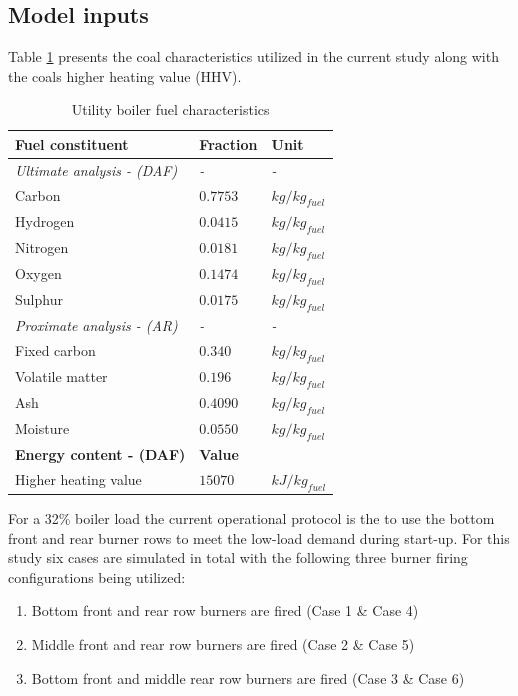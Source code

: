 \documentclass[review]{elsarticle}
\begin{document}
\subsection{Model inputs}
Table \ref{tbl_fuel} presents the coal characteristics utilized in the current study along with the coals higher heating value (HHV).\\
\begin{table}[h!]
\centering
\caption{Utility boiler fuel characteristics}
\vspace{5mm}
\label{tbl_fuel}
{\tabulinesep=1.2mm
\begin{tabularx}{\textwidth}{p{} p{} l}
\hline
\textbf{Fuel constituent} & \textbf{Fraction} & \textbf{Unit}\\
\hline
\textit{Ultimate analysis - (DAF)} & \textit{-} & \textit{-}\\
Carbon & $0.7753$ & $kg/kg_{fuel}$\\
Hydrogen & $0.0415$ & $kg/kg_{fuel}$\\
Nitrogen & $0.0181$ & $kg/kg_{fuel}$\\
Oxygen & $0.1474$ & $kg/kg_{fuel}$\\
Sulphur & $0.0175$ & $kg/kg_{fuel}$\\
\textit{Proximate analysis - (AR)} & \textit{-} & \textit{-}\\
Fixed carbon & $0.340$ & $kg/kg_{fuel}$\\
Volatile matter & $0.196$ & $kg/kg_{fuel}$\\
Ash & $0.4090$ & $kg/kg_{fuel}$\\
Moisture & $0.0550$ & $kg/kg_{fuel}$\\
\hline
\textbf{Energy content - (DAF)} & \textbf{Value} &\\
\hline
Higher heating value & $15070$ & $kJ/kg_{fuel}$\\
\hline
\end{tabularx}}
\end{table}

For a 32\% boiler load the current operational protocol is the to use the bottom front and rear burner rows to meet the low-load demand during start-up.  For this study six cases are simulated in total with the following three burner firing configurations being utilized:
\begin{enumerate}
\item Bottom front and rear row burners are fired (Case 1 \& Case 4)
\item Middle front and rear row burners are fired (Case 2 \& Case 5)
\item Bottom front and middle rear row burners are fired (Case 3 \& Case 6)
\end{enumerate}
\end{document}
